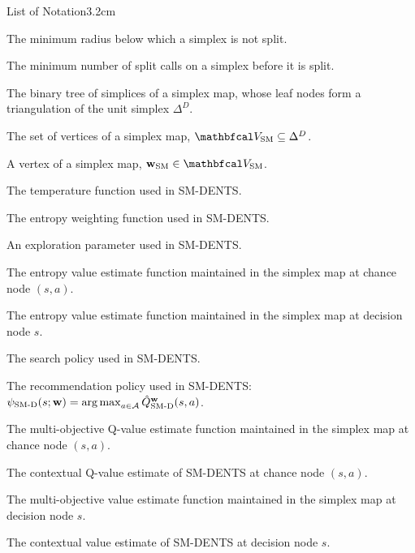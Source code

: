 \begin{mclistof}{List of Notation}{3.2cm}
    \item[$\splitminradius$]
        \hspace{0.75cm} The minimum radius below which a simplex is not split.
    \item[$\splitminvis$]
        \hspace{0.6cm} The minimum number of split calls on a simplex before it is split.
    \item[$\TSM$]
        The binary tree of simplices of a simplex map, whose leaf nodes form a triangulation of the unit simplex $\Delta^D$.
    \item[$\VSM$]
        The set of vertices of a simplex map, $\VSM\subseteq\Delta^D$.
    \item[$\wSM$]
        A vertex of a simplex map, $\wSM\in\VSM$. %
    \\
    \item[$\alphasmd$]
        The temperature function used in SM-DENTS.
    \item[$\betasmd$]
        The entropy weighting function used in SM-DENTS.
    \item[$\epssmd$]
        An exploration parameter used in SM-DENTS.
    \item[$\HQsmd(s,a;\cdot)$]
        The entropy value estimate function maintained in the simplex map at chance node $(s,a)$.
    \item[$\HVsmd(s;\cdot)$]
        The entropy value estimate function maintained in the simplex map at decision node $s$.
    \item[$\pismd$]
        The search policy used in SM-DENTS.
    \item[$\psismd$]
        The recommendation policy used in SM-DENTS: ${\psi_{{\textnormal{SM-D}}}}(s;\mathbf{w})=\operatorname*{arg\,max}_{a\in\mathcal{A}}{\hat{Q}^{\mathbf{w}}_{{\textnormal{SM-D}}}}(s,a)$. %
    \item[$\Qsmd(s,a;\cdot)$]
        The multi-objective Q-value estimate function maintained in the simplex map at chance node $(s,a)$.
    \item[$\Qsmdctx(s,a)$]
        The contextual Q-value estimate of SM-DENTS at chance node $(s,a)$.
    \item[$\Vsmd(s;\cdot)$]
        The multi-objective value estimate function maintained in the simplex map at decision node $s$.
    \item[$\Vsmdctx(s)$]
        The contextual value estimate of SM-DENTS at decision node $s$.

\end{mclistof} 